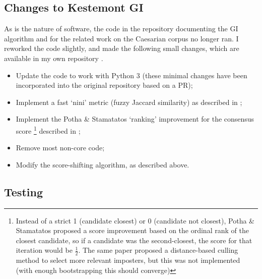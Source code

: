 \documentclass[
    hf
]{ceurart}
\begin{document}
\subsection{Changes to Kestemont GI}

As is the nature of software, the code in the repository documenting the GI algorithm and for the
related work on the Caesarian corpus no longer ran. I reworked the code slightly, and made the
following small changes, which are available in my own repository \cite{nagy_ruzicka}.

\begin{itemize}
    \item Update the code to work with Python 3 (these minimal changes have been incorporated into
          the original repository based on a PR);
    \item Implement a fast `nini' metric (fuzzy Jaccard similarity) as described in \cite{nini_aa};
    \item Implement the Potha \& Stamatatos `ranking' improvement for the consensus score%
          \footnote{ Instead of a strict 1 (candidate closest) or 0 (candidate not closest), Potha
              \& Stamatatos proposed a score improvement based on the ordinal rank of the closest
              candidate, so if a candidate was the second-closest, the score for that iteration
              would be $\frac{1}{2}$. The same paper proposed a distance-based culling method to
              select more relevant imposters, but this was not implemented (with enough
              bootstrapping this should converge)}
          described in \cite{potha_improved_gi};
    \item Remove most non-core code;
    \item Modify the score-shifting algorithm, as described above.
\end{itemize}

\subsection{Testing}
\end{document}
